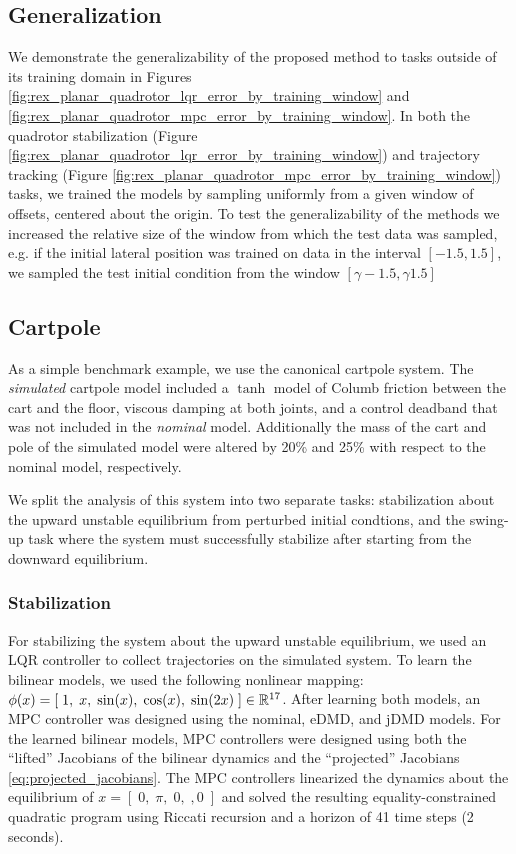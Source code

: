 \documentclass{article}
\begin{document}
\subsection{Generalization}
We demonstrate the generalizability of the proposed method to tasks outside of its training
domain in Figures \ref{fig:rex_planar_quadrotor_lqr_error_by_training_window} and 
\ref{fig:rex_planar_quadrotor_mpc_error_by_training_window}. In both the quadrotor 
stabilization (Figure \ref{fig:rex_planar_quadrotor_lqr_error_by_training_window}) and 
trajectory tracking (Figure \ref{fig:rex_planar_quadrotor_mpc_error_by_training_window})
tasks, we trained the models by sampling uniformly from a given window of offsets, centered 
about the origin. 
To test the generalizability of the methods we increased the relative size of the window 
from which the test data was sampled, e.g. if the initial lateral position was trained on 
data in the interval $[-1.5,1.5]$, we sampled the test initial condition from the window 
$[\gamma -1.5, \gamma 1.5]$

\subsection{Cartpole}
As a simple benchmark example, we use the canonical cartpole system. The \textit{simulated}
cartpole model included a $\tanh$ model of Columb friction between the cart and the 
floor, viscous damping at both joints, and a control deadband that was not included in the 
\textit{nominal} model. Additionally the mass of the cart and pole of the simulated model 
were altered by 20\% and 25\% with respect to the nominal model, respectively. 

We split the analysis of this system into two separate tasks: stabilization about the upward
unstable equilibrium from perturbed initial condtions, and the swing-up task where the 
system must successfully stabilize after starting from the downward equilibrium.

\subsubsection{Stabilization}

For stabilizing the system about the upward unstable equilibrium, we used an LQR controller
to collect trajectories on the simulated system. To learn
the bilinear models, we used the following nonlinear mapping: $\phi(x) = [\; 1,\; x,\;
\sin(x),\; \cos(x),\; \sin(2x)\; ] \in \mathbb{R}^{17}$.  After learning both models, an MPC
controller was designed using the nominal, eDMD, and jDMD models. For the learned bilinear
models, MPC controllers were designed using both the ``lifted'' Jacobians of the bilinear 
dynamics and the ``projected'' Jacobians \eqref{eq:projected_jacobians}. The MPC controllers
linearized the dynamics about the equilibrium of $x = [\;0,\; \pi,\; 0,\;, 0\;]$ and solved
the resulting equality-constrained quadratic program using Riccati recursion and a horizon
of 41 time steps (2 seconds). 
\end{document}
